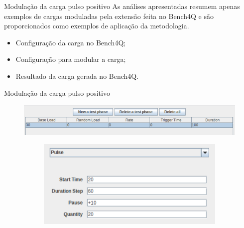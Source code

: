 \begin{frame}{Modulação da carga pulso positivo}
As análises apresentadas resumem apenas exemplos de cargas moduladas pela extensão feita no Bench4Q e  são proporcionados como exemplos de aplicação da metodologia. 
\begin{itemize}
	\item Configuração da carga no Bench4Q;
	\item Configuração para modular a carga;
	\item Resultado da carga gerada no Bench4Q.
\end{itemize}

\end{frame}
	
\begin{frame}{Modulação da carga pulso positivo}
	\begin{figure}
		\centering
		\includegraphics[scale=0.43]{../monograph/images/condiguracao-carga-bench4q1.png}
	\end{figure}
	\begin{figure}
		\centering
		\begin{minipage}{.35\textwidth}
			\begin{figure}
				\centering
				\includegraphics[scale=0.37]{../monograph/images/condiguracao-carga-modulada1.png}
			\end{figure}
		\end{minipage}
		\begin{minipage}{.45\textwidth}

\end{minipage}
\end{figure}
\end{frame}
